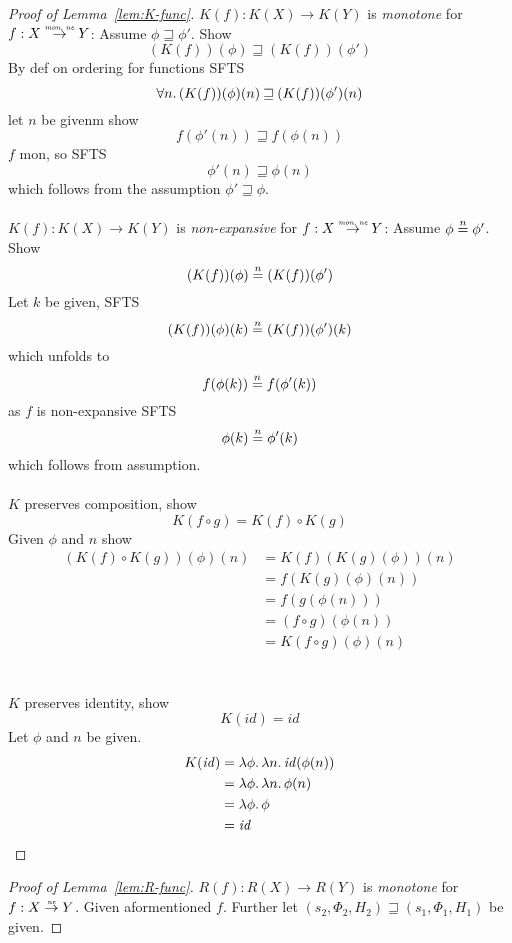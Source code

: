 \documentclass{article}
\newcommand{\monnefun}{\stackrel{\textit{\tiny{mon, ne}}}{\rightarrow}}
\newcommand{\nefun}{\stackrel{\textit{\tiny{ne}}}{\rightarrow}}
\newcommand{\nequal}[1][n]{\stackrel{\tiny{#1}}{=}}
\newcommand{\id}{\var{id}}
\newcommand{\var}[1]{\mathit{#1}}
\newcommand{\future}{\mathbin{\sqsupseteq}}
\begin{document}
\begin{appendices}
\begin{proof}[Proof of Lemma~\ref{lem:K-func}]
  $K(f) : K(X) \rightarrow K(Y)$ is \emph{monotone} for $f : X \monnefun Y$:
  Assume $\phi \future \phi'$. Show
  \[
    (K(f))(\phi) \future (K(f))(\phi') 
  \]
  By def on ordering for functions SFTS
  \[
    \forall n \ldotp (K(f))(\phi)(n) \future (K(f))(\phi')(n)
  \]
  let $n$ be givenm show
  \[
    f(\phi'(n)) \future f(\phi(n))
  \]
  $f$ mon, so SFTS
  \[
    \phi'(n) \future \phi(n)
  \]
  which follows from the assumption $\phi' \future \phi$.\\\\
  $K(f) : K(X) \rightarrow K(Y)$ is \emph{non-expansive} for $f : X \monnefun Y$:
  Assume $\phi \nequal \phi'$. Show
  \[
    (K(f))(\phi) \nequal (K(f))(\phi') 
  \]
  Let $k$ be given, SFTS
  \[
    (K(f))(\phi)(k) \nequal (K(f))(\phi')(k)
  \]
  which unfolds to
  \[
    f(\phi(k)) \nequal f(\phi'(k))
  \]
  as $f$ is non-expansive SFTS
  \[
    \phi(k) \nequal \phi'(k)
  \]
  which follows from assumption.\\\\
  $K$ preserves composition, show
  \[
    K(f \circ g) = K(f) \circ K(g)
  \]
  Given $\phi$ and $n$ show
  \begin{align*}
    (K(f) \circ K(g))(\phi)(n) & = K(f)(K(g)(\phi))(n) \\
                               & = f(K(g)(\phi)(n)) \\
                               & = f(g(\phi(n))) \\
                               & = (f \circ g)(\phi(n)) \\
                               & = K(f \circ g)(\phi)(n)
  \end{align*}\\\\
  $K$ preserves identity, show
  \[
    K(\id) = \id
  \]
  Let $\phi$ and $n$ be given.
  \begin{align*}
    K(\id) & = \lambda \phi \ldotp \lambda n \ldotp \id(\phi(n)) \\
           & = \lambda \phi \ldotp \lambda n \ldotp \phi(n) \\
           & = \lambda \phi \ldotp \phi \\
           & = \id
  \end{align*}
\end{proof}

\begin{proof}[Proof of Lemma~\ref{lem:R-func}]
   $R(f) : R(X) \rightarrow R(Y)$ is \emph{monotone} for $f : X \nefun Y$. Given aformentioned $f$. Further let $(s_2,\Phi_2,H_2) \future (s_1,\Phi_1,H_1)$ be given. 


\end{proof}
\end{appendices}
\end{document}
